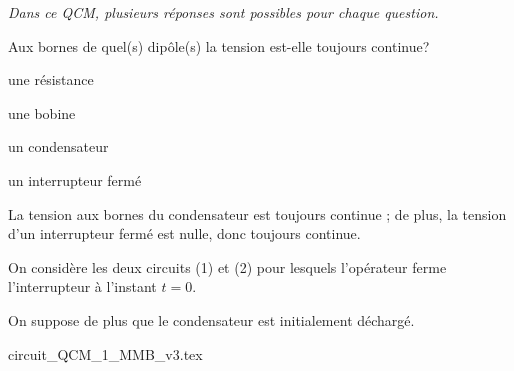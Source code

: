 \hauteurLargeurCadreReponse		{6mm}{1.5cm}
\initialisationEntrainement

\debutEntrainement

\smallskip

{\itshape Dans ce QCM, plusieurs réponses sont possibles pour chaque question.}

\smallskip


\begin{enonce}
	Aux bornes de quel(s) dipôle(s) la tension est-elle toujours continue? 
	\begin{listeQCM2Colonnes}
	\item une résistance
	\item une bobine
	\item un condensateur
	\item un interrupteur fermé
	\end{listeQCM2Colonnes}
\end{enonce}


\begin{corrige}
La tension aux bornes du condensateur est toujours continue ; de plus, la tension d'un interrupteur fermé est nulle, donc toujours continue.
\end{corrige}



\pauseEntrainement

\bigskip

On considère les deux circuits (1) et (2) pour lesquels l'opérateur ferme l'interrupteur à l'instant $t=0$. 

On suppose de plus que le condensateur est initialement déchargé.
\begin{center}
{circuit_QCM_1_MMB_v3.tex}
\end{center}

